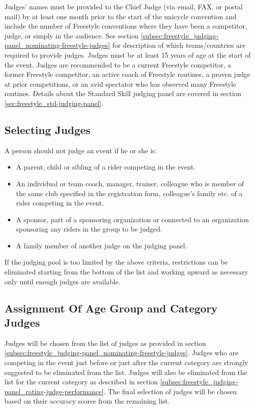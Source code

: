 Judges' names must be provided to the Chief Judge (via email, FAX, or postal mail) by at least one month prior to the start of the unicycle convention and include the number of Freestyle conventions where they have been a competitor, judge, or simply in the audience.
See section \ref{subsec:freestyle_judging-panel_nominating-freestyle-judges} for description of which teams/countries are required to provide judges.
Judges must be at least 15 years of age at the start of the event.
Judges are recommended to be a current Freestyle competitor, a former Freestyle competitor, an active coach of Freestyle routines, a proven judge at prior competitions, or an avid spectator who has observed many Freestyle routines.
Details about the Standard Skill judging panel are covered in section \ref{sec:freestyle_std-judging-panel}.

\subsection{Selecting Judges \label{subsec:freestyle_judging-panel_selecting-judges}}
A person should not judge an event if he or she is:
\begin{itemize}
\item A parent, child or sibling of a rider competing in the event.
\item An individual or team coach, manager, trainer, colleague who is member of the same club specified in the registration form, colleague's family etc.
of a rider competing in the event.
\item A sponsor, part of a sponsoring organization or connected to an organization sponsoring any riders in the group to be judged.
\item A family member of another judge on the judging panel.
\end{itemize}
If the judging pool is too limited by the above criteria, restrictions can be eliminated starting from the bottom of the list and working upward as necessary only until enough judges are available.

\subsection{Assignment Of Age Group and Category Judges}
Judges will be chosen from the list of judges as provided in section \ref{subsec:freestyle_judging-panel_nominating-freestyle-judges}.
Judges who are competing in the event just before or just after the current category are strongly suggested to be eliminated from the list.
Judges will also be eliminated from the list for the current category as described in section \ref{subsec:freestyle_judging-panel_rating-judge-performance}.
The final selection of judges will be chosen based on their accuracy scores from the remaining list.


